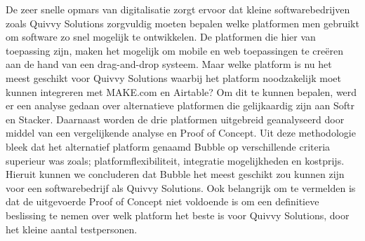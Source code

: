 De zeer snelle opmars van digitalisatie zorgt ervoor dat kleine softwarebedrijven zoals Quivvy Solutions zorgvuldig 
moeten bepalen welke platformen men gebruikt om software zo snel mogelijk te ontwikkelen.
 De platformen die hier van toepassing zijn, maken het mogelijk om mobile en web toepassingen 
 te creëren aan de hand van een drag-and-drop systeem. Maar welke platform is nu het meest geschikt voor Quivvy Solutions waarbij het 
 platform noodzakelijk moet kunnen integreren met MAKE.com en Airtable? Om dit te kunnen bepalen, werd er een analyse gedaan over alternatieve platformen
 die gelijkaardig zijn aan Softr en Stacker. Daarnaast worden de drie platformen uitgebreid geanalyseerd door middel van een vergelijkende analyse en Proof of Concept. 
 Uit deze methodologie bleek dat het alternatief platform genaamd Bubble op verschillende criteria superieur was zoals; platformflexibiliteit, integratie mogelijkheden 
 en kostprijs. Hieruit kunnen we concluderen dat Bubble het meest geschikt zou kunnen zijn voor een softwarebedrijf als Quivvy Solutions. 
 Ook belangrijk om te vermelden is dat de uitgevoerde Proof of Concept niet voldoende is om een definitieve beslissing te 
 nemen over welk platform het beste is voor Quivvy Solutions, door het kleine aantal testpersonen.
